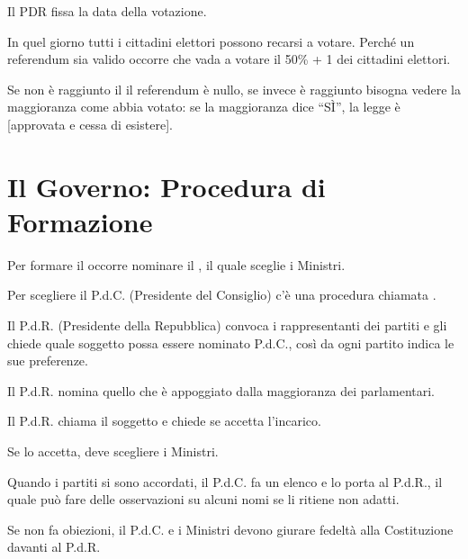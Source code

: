 \documentclass[letterpaper,10pt,italian]{sphinxmanual}
\begin{document}
\sphinxAtStartPar
Il PDR fissa la data della votazione.

\sphinxAtStartPar
In quel giorno tutti i cittadini elettori possono recarsi a votare.
Perché un referendum sia valido occorre che vada a votare il 50\% + 1 dei cittadini elettori.

\sphinxAtStartPar
Se non è raggiunto il  il referendum è nullo, se invece è raggiunto bisogna vedere la maggioranza come abbia votato:
se la maggioranza dice “SÌ”, la legge è {[}approvata e cessa di esistere{]}.

\sphinxstepscope


\chapter{Il Governo: Procedura di Formazione}
\label{\detokenize{Il GOVERNO - Formazione:il-governo-procedura-di-formazione}}\label{\detokenize{Il GOVERNO - Formazione::doc}}
\begin{figure}[htbp]
\centering

\noindent{}
\end{figure}

\sphinxAtStartPar
Per formare il  occorre nominare il , il quale sceglie i Ministri.

\sphinxAtStartPar
Per scegliere il P.d.C. (Presidente del Consiglio) c’è una procedura chiamata .

\sphinxAtStartPar
Il P.d.R. (Presidente della Repubblica) convoca i rappresentanti dei partiti e gli chiede quale soggetto
possa essere nominato P.d.C., così da ogni partito indica le sue preferenze.

\sphinxAtStartPar
Il P.d.R. nomina quello che è appoggiato dalla maggioranza dei parlamentari.

\sphinxAtStartPar
Il P.d.R. chiama il soggetto e chiede se accetta l’incarico.

\sphinxAtStartPar
Se lo accetta, deve scegliere i Ministri.

\sphinxAtStartPar
Quando i partiti si sono accordati, il P.d.C. fa un elenco e lo porta al P.d.R., il quale può fare delle
osservazioni su alcuni nomi se li ritiene non adatti.

\sphinxAtStartPar
Se non fa obiezioni, il P.d.C. e i Ministri devono giurare fedeltà alla Costituzione davanti al P.d.R.
\end{document}
